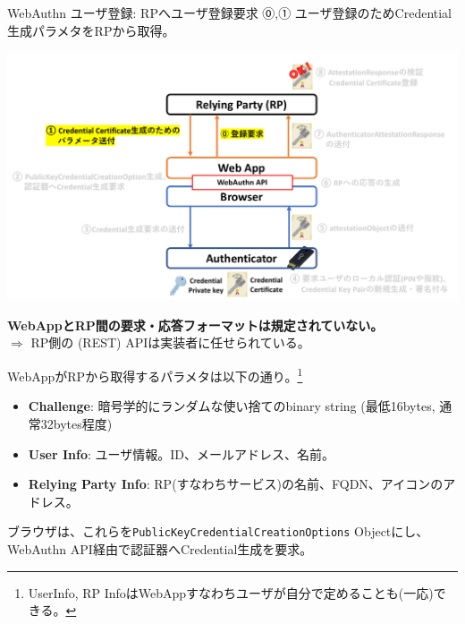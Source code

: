 \documentclass[12pt,dvipdfmx,uplatex]{beamer}
\begin{document}
\begin{frame}{WebAuthn ユーザ登録: RPへユーザ登録要求}
⓪,① ユーザ登録のためCredential生成パラメタをRPから取得。
\begin{center}
\includegraphics[width=0.9\linewidth]{Figs/webauthn-registration1.pdf}
\end{center}
\textbf{WebAppとRP間の要求・応答フォーマットは規定されていない。}\\
$\Rightarrow$ RP側の (REST) APIは実装者に任せられている。
\end{frame}

\begin{frame}
WebAppがRPから取得するパラメタは以下の通り。\footnote[frame]{\scriptsize UserInfo, RP InfoはWebAppすなわちユーザが自分で定めることも(一応)できる。}
\begin{itemize}
 \item \textbf{Challenge}: \alert{暗号学的にランダムな使い捨てのbinary string (最低16bytes, 通常32bytes程度)}
 \item \textbf{User Info}: ユーザ情報。ID、メールアドレス、名前。
 \item \textbf{Relying Party Info}: RP(すなわちサービス)の名前、FQDN、アイコンのアドレス。
\end{itemize}

\vspace{2ex}
ブラウザは、これらを\texttt{PublicKeyCredentialCreationOptions} Objectにし、WebAuthn API経由で認証器へCredential生成を要求。

\end{frame}
\end{document}
